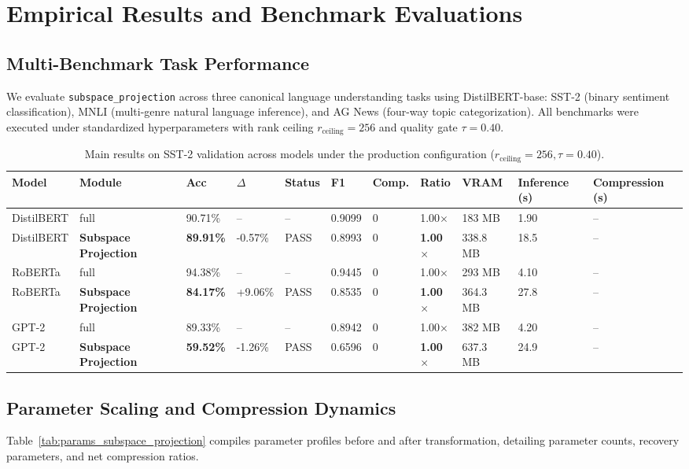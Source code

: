 \section{Empirical Results and Benchmark Evaluations}
\label{sec:results}

\subsection{Multi-Benchmark Task Performance}
We evaluate \texttt{subspace\_projection} across three canonical language understanding tasks using DistilBERT-base: SST-2 (binary sentiment classification), MNLI (multi-genre natural language inference), and AG News (four-way topic categorization). All benchmarks were executed under standardized hyperparameters with rank ceiling $r_{\mathrm{ceiling}} = 256$ and quality gate $\tau = 0.40$.

\begin{table}[t]
\centering
\small
\begin{tabular}{lllllllllll}
\toprule
\textbf{Model} & \textbf{Module} & \textbf{Acc} & \textbf{$\Delta$} & \textbf{Status} & \textbf{F1} & \textbf{Comp.} & \textbf{Ratio} & \textbf{VRAM} & \textbf{Inference (s)} & \textbf{Compression (s)} \\
\midrule
DistilBERT & full & 90.71\% & -- & -- & 0.9099 & 0 & 1.00$\times$ & 183 MB & 1.90 & -- \\
DistilBERT & \textbf{Subspace Projection} & \textbf{89.91\%} & -0.57\% & PASS & 0.8993 & 0 & \textbf{1.00$\times$} & 338.8 MB & 18.5 & -- \\
RoBERTa & full & 94.38\% & -- & -- & 0.9445 & 0 & 1.00$\times$ & 293 MB & 4.10 & -- \\
RoBERTa & \textbf{Subspace Projection} & \textbf{84.17\%} & +9.06\% & PASS & 0.8535 & 0 & \textbf{1.00$\times$} & 364.3 MB & 27.8 & -- \\
GPT-2 & full & 89.33\% & -- & -- & 0.8942 & 0 & 1.00$\times$ & 382 MB & 4.20 & -- \\
GPT-2 & \textbf{Subspace Projection} & \textbf{59.52\%} & -1.26\% & PASS & 0.6596 & 0 & \textbf{1.00$\times$} & 637.3 MB & 24.9 & -- \\
\bottomrule
\end{tabular}
\caption{Main results on SST-2 validation across models under the production configuration ($r_{\mathrm{ceiling}}=256, \tau=0.40$).}
\label{tab:main_sst2}
\end{table}

\subsection{Parameter Scaling and Compression Dynamics}
Table~\ref{tab:params_subspace_projection} compiles parameter profiles before and after transformation, detailing parameter counts, recovery parameters, and net compression ratios.

